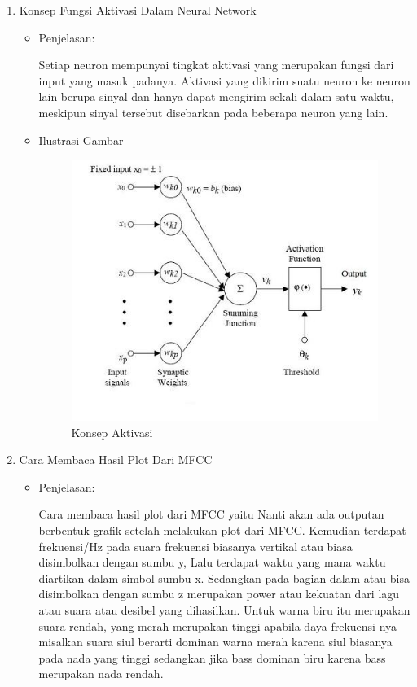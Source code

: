 \begin{enumerate}
\begin{itemize}
\end{itemize}


\item Konsep Fungsi Aktivasi Dalam Neural Network
\begin{itemize}
\item Penjelasan:
\par Setiap neuron mempunyai tingkat aktivasi yang merupakan fungsi dari input yang masuk padanya. Aktivasi yang dikirim suatu neuron ke neuron lain berupa sinyal dan hanya dapat mengirim sekali dalam satu waktu, meskipun sinyal tersebut disebarkan pada beberapa neuron yang lain.

\item Ilustrasi Gambar
\begin{figure}[!hbtp]
\centering
\includegraphics[scale=0.7]{figures/andi/64.jpg}
\caption{Konsep Aktivasi}
\label{Contoh 4}
\end{figure}

\end{itemize}


\item Cara Membaca Hasil Plot Dari MFCC
\begin{itemize}
\item Penjelasan:
\par Cara membaca hasil plot dari MFCC yaitu Nanti akan ada outputan berbentuk grafik setelah melakukan plot dari MFCC. Kemudian terdapat frekuensi/Hz pada suara frekuensi biasanya vertikal atau biasa disimbolkan dengan sumbu y, Lalu terdapat waktu yang mana waktu diartikan dalam simbol sumbu x. Sedangkan pada bagian dalam atau bisa disimbolkan dengan sumbu z merupakan power atau kekuatan dari lagu atau suara atau desibel yang dihasilkan. Untuk warna biru itu merupakan suara rendah, yang merah merupakan tinggi apabila daya frekuensi nya misalkan suara siul berarti dominan warna merah karena siul biasanya pada nada yang tinggi sedangkan jika bass dominan biru karena bass merupakan nada rendah. 


\end{itemize}
\end{enumerate}
